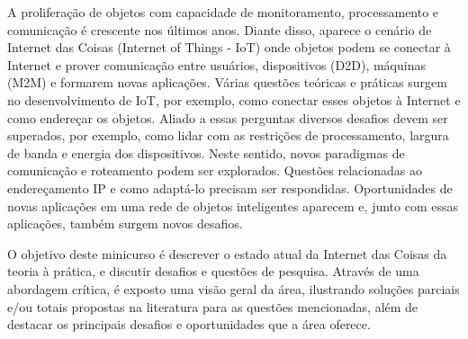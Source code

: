 \documentclass{SBCbookchapter}
\begin{document}
\begin{resumo}
\begin{otherlanguage}{brazilian}
A proliferação de objetos com capacidade de monitoramento, processamento e 
comunicação é crescente nos últimos anos. Diante disso, aparece o cenário de 
Internet das Coisas (Internet of Things - IoT) onde objetos podem se conectar à 
Internet e prover comunicação entre usuários, dispositivos (D2D), máquinas (M2M) 
e formarem novas aplicações. Várias questões teóricas e práticas surgem no 
desenvolvimento de IoT, por exemplo, como conectar esses objetos à Internet e 
como endereçar os objetos. Aliado a essas perguntas diversos desafios devem ser 
superados, por exemplo, como lidar com as restrições de processamento, largura 
de banda e energia dos dispositivos. Neste sentido, novos paradigmas de 
comunicação e roteamento podem ser explorados. Questões relacionadas ao 
endereçamento IP e como adaptá-lo precisam ser respondidas. Oportunidades de 
novas aplicações em uma rede de objetos inteligentes aparecem e, junto com essas 
aplicações, também surgem novos desafios. 

O objetivo deste minicurso é descrever o estado atual da Internet das Coisas da 
teoria à prática, e discutir desafios e questões de pesquisa. Através de uma 
abordagem crítica, é exposto uma visão geral da área, ilustrando soluções 
parciais e/ou totais propostas na literatura para as questões mencionadas, além 
de destacar os principais desafios e oportunidades que a área oferece. 



\end{otherlanguage}
\end{resumo}









\nocite{*}


\end{document}
